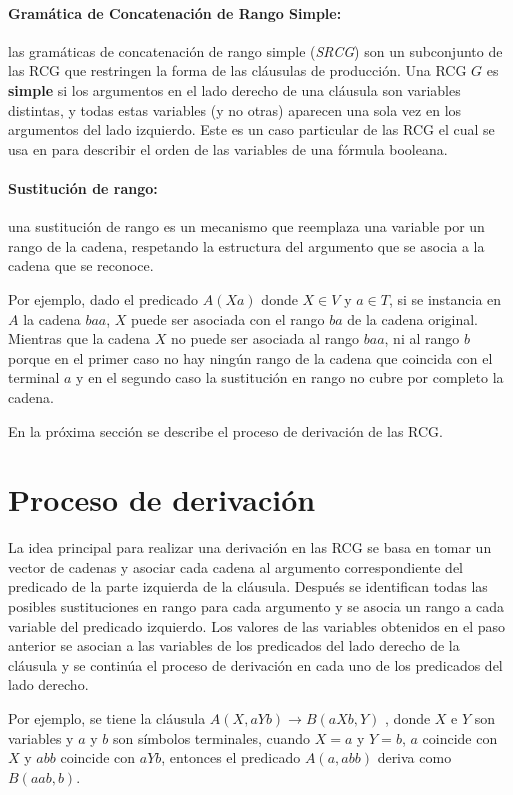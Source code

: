 \documentclass[12pt]{article}
\begin{document}
\paragraph{Gramática de Concatenación de Rango Simple:} las gramáticas de concatenación de rango simple 
(\textit{SRCG}) son un subconjunto de las RCG que restringen la forma de las cláusulas de producción.  
Una RCG $G$ es \textbf{simple} si los argumentos en el lado derecho de una cláusula son variables distintas, 
y todas estas variables (y no otras) aparecen una sola vez en los argumentos del lado izquierdo.  
Este es un caso particular de las RCG el cual se usa en \cite{aSRCSAT} para describir el orden de las variables de una fórmula booleana.

\paragraph{Sustitución de rango:} una sustitución de rango es un mecanismo que reemplaza una variable por un 
rango de la cadena, respetando la estructura del argumento que se asocia a la cadena que se reconoce. 

Por ejemplo, dado el predicado $A(Xa)$ donde $X \in V$ y $a \in T$, si se instancia en $A$ la cadena $baa$, $X$ puede ser asociada con el rango $ba$ de la cadena original. Mientras
que la cadena $X$ no puede ser asociada al rango $baa$, ni al rango $b$ porque en el primer caso no hay ningún rango de la cadena
que coincida con el terminal $a$ y en el segundo caso la sustitución en rango no cubre por completo la cadena.

En la próxima sección se describe el proceso de derivación de las RCG.
\section{Proceso de derivación}

La idea principal para realizar una derivación en las RCG se basa en tomar un vector de cadenas y asociar cada 
cadena al argumento correspondiente del predicado de la parte izquierda de la cláusula. Después se identifican 
todas las posibles sustituciones en rango para cada argumento y se asocia un rango a cada variable del predicado
izquierdo. Los valores de las variables obtenidos en el paso anterior se asocian a las variables de los predicados
del lado derecho de la cláusula y se continúa el proceso de derivación en cada uno de los predicados del lado
derecho.

Por ejemplo, se tiene la cláusula $A(X,aYb)\to B(aXb,Y)$ , donde $X$ e $Y$ son variables y $a$ y $b$ son símbolos terminales, cuando $ X=a$ y $Y=b$, $a$ coincide con $X$ y $abb$ coincide con $aYb$, entonces el predicado $A(a,abb)$ deriva como $B(aab,b)$.
\end{document}
